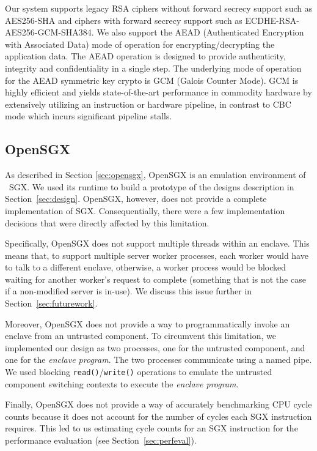 \documentclass[../main.tex]{subfiles}
\begin{document}
Our system supports legacy RSA ciphers without forward secrecy support such as
AES256-SHA and ciphers with forward secrecy support such as
ECDHE-RSA-AES256-GCM-SHA384. We also support the AEAD (Authenticated Encryption
with Associated Data) mode of operation for encrypting/decrypting the
application data. The AEAD operation is designed to provide authenticity,
integrity and confidentiality in a single step. The underlying mode of
operation for the AEAD symmetric key crypto is GCM (Galois
Counter Mode). GCM is highly efficient and yields state-of-the-art performance
in commodity hardware by extensively utilizing an instruction or hardware
pipeline, in contrast to CBC mode which incurs significant pipeline stalls.

\subsection{OpenSGX}
\label{subsec:opensgx}
As described in Section \ref{sec:opensgx}, OpenSGX is an emulation
environment of \Intel~SGX. We used its runtime to build a prototype of
the designs description in Section~\ref{sec:design}. OpenSGX, however,
does not provide a complete implementation of SGX. Consequentially,
there were a few implementation decisions that were directly affected
by this limitation.

Specifically, OpenSGX does not support multiple threads within an
enclave. This means that, to support multiple server worker processes,
each worker would have to talk to a different enclave, otherwise, a
worker process would be blocked waiting for another worker's request
to complete (something that is not the case if a non-modified server
is in-use). We discuss this issue further in
Section~\ref{sec:futurework}.

Moreover, OpenSGX does not provide a way to programmatically invoke an
enclave from an untrusted component. To circumvent this limitation, we
implemented our design as two processes, one for the untrusted
component, and one for the \textit{enclave program}. The two processes
communicate using a named pipe. We used blocking
\texttt{read()}/\texttt{write()} operations to emulate the untrusted
component switching contexts to execute the \textit{enclave program}.

Finally, OpenSGX does not provide a way of accurately benchmarking
CPU cycle counts because it does not account for the number of cycles
each SGX instruction requires. This led to us estimating cycle counts
for an SGX instruction for the performance evaluation (see
Section~\ref{sec:perfeval}).
\end{document}
